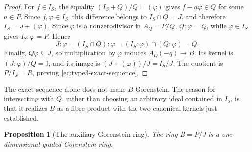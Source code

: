 \documentclass[10pt]{amsart}
\theoremstyle{plain}
\newtheorem{proposition}[lemma]{Proposition}
\begin{document}
\begin{proof}
For \(f\in I_S\), the equality
\((I_S+Q)/Q=(\bar\varphi)\) gives
\(f-a\varphi\in Q\) for some \(a\in P\).  Since
\(f,\varphi\in I_S\), this difference belongs to
\(I_S\cap Q=J\), and therefore \(I_S=J+(\varphi)\).
Since \(\bar\varphi\) is a nonzerodivisor in \(A_Q=P/Q\),
\(Q:\varphi=Q\), while \(\varphi\in I_S\) gives
\(I_S:\varphi=P\).  Hence
\[
J:\varphi
=(I_S\cap Q):\varphi
=(I_S:\varphi)\cap(Q:\varphi)
=Q.
\]
Finally, \(Q\varphi\subseteq J\), so multiplication by \(\varphi\)
induces \(A_Q(-q)\to B\).  Its kernel is
\((J:\varphi)/Q=0\), and its image is
\((J+(\varphi))/J=I_S/J\).  The quotient is \(P/I_S=R\), proving
\eqref{eq:type3-exact-sequence}.
\end{proof}

The exact sequence alone does not make \(B\) Gorenstein.  The reason for
intersecting with \(Q\), rather than choosing an arbitrary ideal contained
in \(I_S\), is that it realizes \(B\) as a fibre product with the two
canonical kernels just established.

\begin{proposition}[The auxiliary Gorenstein ring]\label{prop:type3-gorenstein}
The ring \(B=P/J\) is a one-dimensional graded Gorenstein ring.
\end{proposition}
\end{document}
